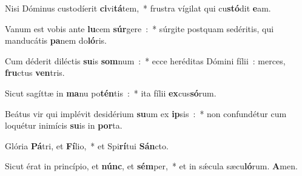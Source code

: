 ﻿\item Nisi Dóminus custodíerit \textbf{ci}\-vi\textbf{tá}\-tem,~* frustra vígilat qui cu\textbf{stó}\-dit \textbf{e}\-am.
\item Vanum est vobis ante \textbf{lu}\-cem \textbf{súr}\-gere~:~* súrgite postquam sedéritis, qui manducátis \textbf{pa}\-nem do\textbf{ló}\-ris.
\item Cum déderit diléctis \textbf{su}\-is \textbf{som}\-num~:~* ecce heréditas Dómini fílii~: merces, \textbf{fru}\-ctus \textbf{ven}\-tris.
\item Sicut sagíttæ in \textbf{ma}\-nu po\textbf{tén}\-tis~:~* ita fílii \textbf{ex}\-cus\textbf{só}\-rum.
\item Beátus vir qui implévit desidérium \textbf{su}\-um ex \textbf{ip}\-sis~:~* non confundétur cum loquétur inimícis \textbf{su}\-is in \textbf{por}\-ta.
\item Glória \textbf{Pá}\-tri, et \textbf{Fí}\-lio,~* et Spi\textbf{rí}\-tui \textbf{Sán}\-cto.
\item Sicut érat in princípio, et \textbf{núnc}, et \textbf{sém}\-per,~* et in sǽcula sæcu\textbf{ló}\-rum. \textbf{A}\-men.